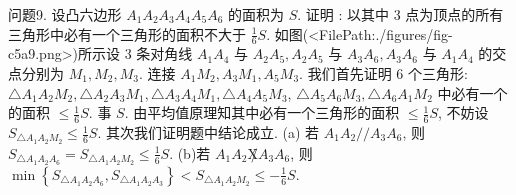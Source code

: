 问题9. 设凸六边形 $A_1 A_2 A_3 A_4 A_5 A_6$ 的面积为 $S$. 证明 : 以其中 3 点为顶点的所有三角形中必有一个三角形的面积不大于 $\frac{1}{6} S$.
如图(<FilePath:./figures/fig-c5a9.png>)所示设 3 条对角线 $A_1 A_4$ 与 $A_2 A_5, A_2 A_5$ 与 $A_3 A_6, A_3 A_6$ 与 $A_1 A_4$ 的交点分别为 $M_1, M_2, M_3$. 连接 $A_1 M_2, A_3 M_1, A_5 M_3$. 我们首先证明 6 个三角形: $\triangle A_1 A_2 M_2, \triangle A_2 A_3 M_1, \triangle A_3 A_4 M_1, \triangle A_4 A_5 M_3$, $\triangle A_5 A_6 M_3, \triangle A_6 A_1 M_2$ 中必有一个的面积 $\leqslant \frac{1}{6} S$. 事 $S$. 由平均值原理知其中必有一个三角形的面积 $\leqslant \frac{1}{6} S$, 不妨设 $S_{\triangle A_1 A_2 M_2} \leqslant \frac{1}{6} S$. 其次我们证明题中结论成立.
(a) 若 $A_1 A_2 / / A_3 A_6$, 则 $S_{\triangle A_1 A_2 A_6}=S_{\triangle A_1 A_2 M_2} \leqslant\frac{1}{6} S$. (b)若 $A_1 A_2 \not X A_3 A_6$, 则 $\min \left\{S_{\triangle A_1 A_2 A_6}, S_{\triangle A_1 A_2 A_3}\right\}<S_{\triangle A_1 A_2 M_2} \leqslant-\frac{1}{6} S$.


